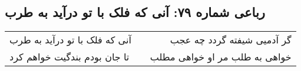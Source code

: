 \begin{center}
\section*{رباعی شماره ۷۹: آنی که فلک با تو درآید به طرب}
\label{sec:0079}
\begin{longtable}{l p{0.5cm} r}
آنی که فلک با تو درآید به طرب
&&
گر آدمیی شیفته گردد چه عجب
\\
تا جان بودم بندگیت خواهم کرد
&&
خواهی به طلب مر او خواهی مطلب
\\
\end{longtable}
\end{center}
